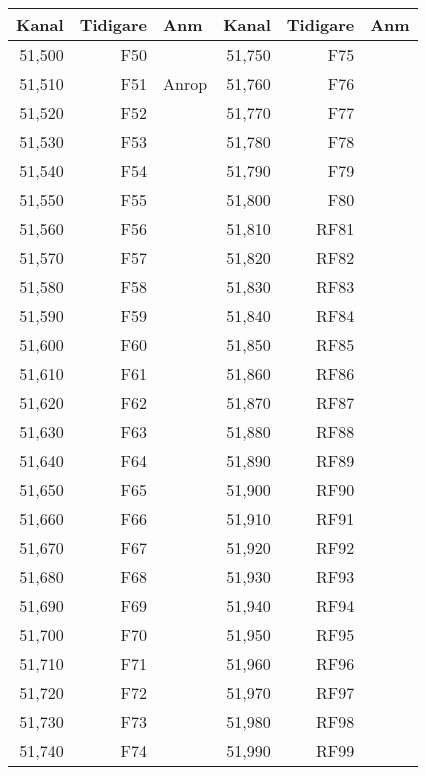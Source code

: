 \begin{longtable}{rrl|rrl}
\textbf{Kanal} & \textbf{Tidigare} & \textbf{Anm}   
&  \textbf{Kanal} & \textbf{Tidigare} & \textbf{Anm} \\ \hline
	51,500 &      F50 &       & 51,750 &      F75 &  \\
	51,510 &      F51 & Anrop & 51,760 &      F76 &  \\
	51,520 &      F52 &       & 51,770 &      F77 &  \\
	51,530 &      F53 &       & 51,780 &      F78 &  \\
	51,540 &      F54 &       & 51,790 &      F79 &  \\
	51,550 &      F55 &       & 51,800 &      F80 &  \\
	51,560 &      F56 &       & 51,810 &     RF81 &  \\
	51,570 &      F57 &       & 51,820 &     RF82 &  \\
	51,580 &      F58 &       & 51,830 &     RF83 &  \\
	51,590 &      F59 &       & 51,840 &     RF84 &  \\
	51,600 &      F60 &       & 51,850 &     RF85 &  \\
	51,610 &      F61 &       & 51,860 &     RF86 &  \\
	51,620 &      F62 &       & 51,870 &     RF87 &  \\
	51,630 &      F63 &       & 51,880 &     RF88 &  \\
	51,640 &      F64 &       & 51,890 &     RF89 &  \\
	51,650 &      F65 &       & 51,900 &     RF90 &  \\
	51,660 &      F66 &       & 51,910 &     RF91 &  \\
	51,670 &      F67 &       & 51,920 &     RF92 &  \\
	51,680 &      F68 &       & 51,930 &     RF93 &  \\
	51,690 &      F69 &       & 51,940 &     RF94 &  \\
	51,700 &      F70 &       & 51,950 &     RF95 &  \\
	51,710 &      F71 &       & 51,960 &     RF96 &  \\
	51,720 &      F72 &       & 51,970 &     RF97 &  \\
	51,730 &      F73 &       & 51,980 &     RF98 &  \\
	51,740 &      F74 &       & 51,990 &     RF99 &
\end{longtable}

